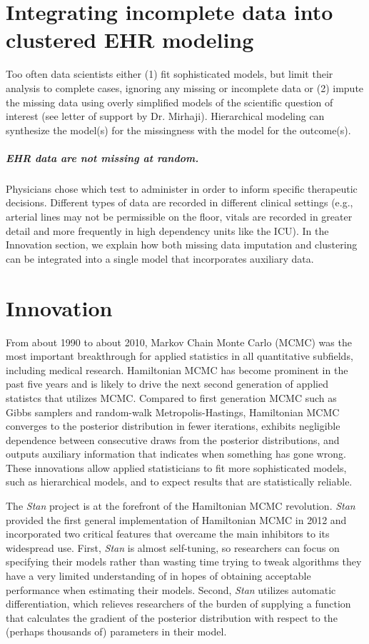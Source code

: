 \documentclass[11pt,notitlepage]{article}
\begin{document}
\section*{Integrating incomplete data into clustered EHR modeling}
Too often data scientists either (1) fit sophisticated models, but limit their analysis 
to complete cases, ignoring any missing or incomplete data or (2) impute the missing 
data using overly simplified models of the scientific question of interest (see letter of 
support by Dr. Mirhaji). Hierarchical modeling can synthesize the model(s) for the missingness
with the model for the outcome(s).

\subparagraph*{EHR data are not missing at random.}
Physicians chose which test to administer in order
to inform specific therapeutic decisions. Different types of data are recorded 
in different clinical settings (e.g., arterial lines may not be permissible on the 
floor, vitals are recorded in greater detail and more frequently in high dependency 
units like the ICU). In the Innovation section, we explain how both missing data 
imputation and clustering can be integrated into a single model that 
incorporates auxiliary data.

\section*{Innovation}

From about 1990 to about 2010, Markov Chain Monte Carlo (MCMC) was the most
important breakthrough for applied statistics in all quantitative subfields,
including medical research. Hamiltonian MCMC has become prominent in the 
past five years and is likely to drive the next second generation of applied
statistcs that utilizes MCMC. Compared to first generation MCMC such as 
Gibbs samplers and random-walk Metropolis-Hastings, Hamiltonian MCMC converges
to the posterior distribution in fewer iterations, exhibits negligible dependence
between consecutive draws from the posterior distributions, and outputs auxiliary
information that indicates when something has gone wrong. These innovations allow
applied statisticians to fit more sophisticated models, such as hierarchical models,
and to expect results that are statistically reliable.

The \textit{Stan} project is at the forefront of the Hamiltonian MCMC revolution.
\textit{Stan} provided the first general implementation of Hamiltonian MCMC in 2012 and
incorporated two critical features that overcame the main inhibitors to its widespread
use. First, \textit{Stan} is almost self-tuning, so
researchers can focus on specifying their models rather than wasting time trying to
tweak algorithms they have a very limited understanding of in hopes of obtaining 
acceptable performance when estimating their models. Second, \textit{Stan} utilizes
automatic differentiation, which relieves researchers of the burden of supplying
a function that calculates the gradient of the posterior distribution with respect
to the (perhaps thousands of) parameters in their model.
\end{document}
